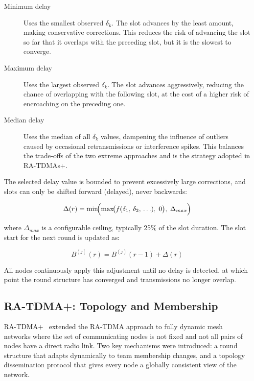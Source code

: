 \begin{description}
\item[Minimum delay] Uses the smallest observed $\delta_k$. The slot
  advances by the least amount, making conservative corrections. This
  reduces the risk of advancing the slot so far that it overlaps with
  the preceding slot, but it is the slowest to converge.
\item[Maximum delay] Uses the largest observed $\delta_k$. The slot
  advances aggressively, reducing the chance of overlapping with the
  following slot, at the cost of a higher risk of encroaching on the
  preceding one.
\item[Median delay] Uses the median of all $\delta_k$ values,
  dampening the influence of outliers caused by occasional retransmissions
  or interference spikes. This balances the trade-offs of the two
  extreme approaches and is the strategy adopted in RA-TDMAs+.
\end{description}

The selected delay value is bounded to prevent excessively large
corrections, and slots can only be shifted forward (delayed), never
backwards:

\begin{equation}
\Delta(r) = \min\!\Bigl(\max\!\bigl(f(\delta_1,\,\delta_2,\,\ldots),\;0\bigr),\;
\Delta_{max}\Bigr)
\label{eq:shift}
\end{equation}

where $\Delta_{max}$ is a configurable ceiling, typically 25\% of the
slot duration. The slot start for the next round is updated as:

\begin{equation}
B^{(j)}(r) = B^{(j)}(r-1) + \Delta(r)
\label{eq:slot-start}
\end{equation}

All nodes continuously apply this adjustment until no delay is detected,
at which point the round structure has converged and transmissions no
longer overlap.

\subsection{RA-TDMA+: Topology and Membership}
\label{sec:ratdma-plus}

RA-TDMA+~\cite{oliveira2018clockless} extended the RA-TDMA approach to
fully dynamic mesh networks where the set of communicating nodes is not
fixed and not all pairs of nodes have a direct radio link. Two key
mechanisms were introduced: a round structure that adapts dynamically
to team membership changes, and a topology dissemination protocol that
gives every node a globally consistent view of the network.

